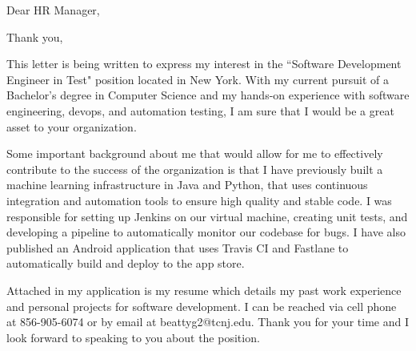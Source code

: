 \documentclass[11pt,a4paper,sans]{moderncv}        %
\begin{document}
\date{\today}
\opening{Dear HR Manager,}
\closing{Thank you,}
\makelettertitle

This letter is being written to express my interest in the ``Software Development Engineer in Test" position located in New York.  With my current pursuit of a Bachelor's degree in Computer Science and my hands-on experience with software engineering, devops, and automation testing, I am sure that I would be a great asset to your organization.


Some important background about me that would allow for me to effectively contribute to the success of the organization is that I have previously built a machine learning infrastructure in Java and Python, that uses continuous integration and automation tools to ensure high quality and stable code. I was responsible for setting up Jenkins on our virtual machine, creating unit tests, and developing a pipeline to automatically monitor our codebase for bugs. I have also published an Android application that uses Travis CI and Fastlane to automatically build and deploy to the app store.

Attached in my application is my resume which details my past work experience and personal projects for software development.  I can be reached via cell phone at 856-905-6074 or by email at beattyg2@tcnj.edu.  Thank you for your time and I look forward to speaking to you about the position.

\makeletterclosing
\end{document}
